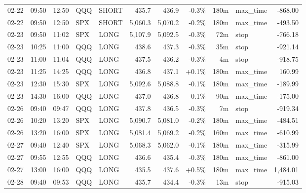 \documentclass[11pt,a4paper,twoside]{article}
\begin{document}
\begin{center}
\begin{longtable}{>{\color{txtmain}}l l l l l r r r r >{\color{txtmain}}l r}
02-22 & 09:50 & 12:50 & QQQ & SHORT & 435.7 & 436.9 & \textcolor{lossred}{-0.3\%} & 180m & max\_time & \textcolor{lossred}{-868.00} \\
02-22 & 09:50 & 12:50 & SPX & SHORT & 5,060.3 & 5,070.2 & \textcolor{lossred}{-0.2\%} & 180m & max\_time & \textcolor{lossred}{-493.50} \\
02-23 & 09:50 & 11:02 & SPX & LONG & 5,107.9 & 5,092.5 & \textcolor{lossred}{-0.3\%} & 72m & stop & \textcolor{lossred}{-766.18} \\
02-23 & 10:25 & 11:00 & QQQ & LONG & 438.6 & 437.3 & \textcolor{lossred}{-0.3\%} & 35m & stop & \textcolor{lossred}{-921.14} \\
02-23 & 11:00 & 11:04 & QQQ & LONG & 437.5 & 436.2 & \textcolor{lossred}{-0.3\%} & 4m & stop & \textcolor{lossred}{-918.75} \\
02-23 & 11:25 & 14:25 & QQQ & LONG & 436.8 & 437.1 & \textcolor{wingreen}{+0.1\%} & 180m & max\_time & \textcolor{wingreen}{160.99} \\
02-23 & 12:30 & 15:30 & SPX & LONG & 5,092.6 & 5,088.8 & \textcolor{lossred}{-0.1\%} & 180m & max\_time & \textcolor{lossred}{-189.99} \\
02-23 & 14:30 & 16:00 & QQQ & LONG & 437.0 & 436.8 & \textcolor{lossred}{-0.1\%} & 90m & max\_time & \textcolor{lossred}{-175.00} \\
02-26 & 09:40 & 09:47 & QQQ & LONG & 437.8 & 436.5 & \textcolor{lossred}{-0.3\%} & 7m & stop & \textcolor{lossred}{-919.34} \\
02-26 & 10:20 & 13:20 & SPX & LONG & 5,090.7 & 5,081.0 & \textcolor{lossred}{-0.2\%} & 180m & max\_time & \textcolor{lossred}{-484.51} \\
02-26 & 13:20 & 16:00 & SPX & LONG & 5,081.4 & 5,069.2 & \textcolor{lossred}{-0.2\%} & 160m & max\_time & \textcolor{lossred}{-610.99} \\
02-27 & 09:40 & 12:40 & SPX & LONG & 5,068.3 & 5,062.0 & \textcolor{lossred}{-0.1\%} & 180m & max\_time & \textcolor{lossred}{-315.99} \\
02-27 & 09:55 & 12:55 & QQQ & LONG & 436.6 & 435.4 & \textcolor{lossred}{-0.3\%} & 180m & max\_time & \textcolor{lossred}{-861.00} \\
02-27 & 13:00 & 16:00 & QQQ & LONG & 435.5 & 437.6 & \textcolor{wingreen}{+0.5\%} & 180m & max\_time & \textcolor{wingreen}{1,484.01} \\
02-28 & 09:40 & 09:53 & QQQ & LONG & 435.7 & 434.4 & \textcolor{lossred}{-0.3\%} & 13m & stop & \textcolor{lossred}{-915.03} \\

\end{longtable}
\end{center}
\end{document}
